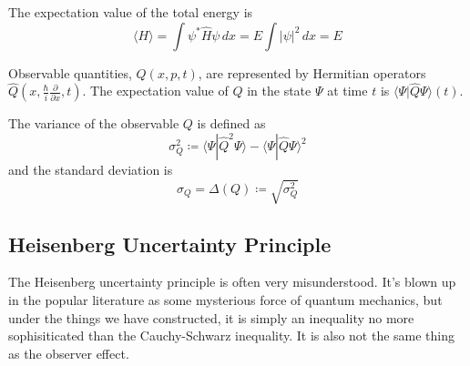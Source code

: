\documentclass{article}
\newcommand{\braket}[2]{\langle #1 | #2 \rangle}
\begin{document}
    \begin{example}
      \label{ex:expectation-of-total-energy}
      The expectation value of the total energy is 
      \begin{equation} 
        \langle H \rangle = \int \psi^\ast \hat{H} \psi \,dx = E \int |\psi|^2 \,dx = E
      \end{equation}      
    \end{example}

    \begin{theorem}
      \label{thm:observables-are-hermitian-operators}
 
      Observable quantities, $Q(x, p, t)$, are represented by Hermitian operators $\hat{Q}(x, \frac{\hbar}{i} \frac{\partial}{\partial x}, t)$. The expectation value of $Q$ in the state $\Psi$ at time $t$ is $\braket{\Psi}{\hat{Q} \Psi} (t)$. 
    \end{theorem}

    \begin{definition}[Variance]
      \label{def:variance}
      The variance of the observable $Q$ is defined as 
      \begin{equation} 
        \sigma_Q^2 \coloneqq \braket{\Psi}{\hat{Q}^2 \Psi} - \braket{\Psi}{\hat{Q} \Psi}^2
      \end{equation}
      and the standard deviation is 
      \begin{equation} 
        \sigma_Q = \Delta(Q) \coloneqq \sqrt{\sigma_Q^2}
      \end{equation}
    \end{definition}

  \subsection{Heisenberg Uncertainty Principle} 

    The Heisenberg uncertainty principle is often very misunderstood. It's blown up in the popular literature as some mysterious force of quantum mechanics, but under the things we have constructed, it is simply an inequality no more sophisiticated than the Cauchy-Schwarz inequality. It is also not the same thing as the observer effect. 
\end{document}
